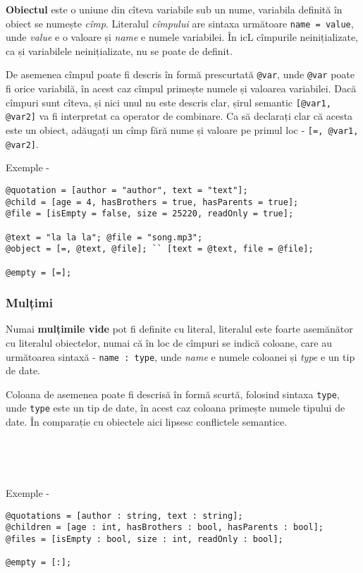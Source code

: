 {\bf Obiectul} este o uniune din cîteva variabile sub un nume, variabila definită în obiect se numește {\it cîmp}. Literalul {\it cîmpului} are sintaxa următoare \texttt{name = value}, unde  {\it value} e o valoare și {\it name} e numele variabilei. În icL cîmpurile neinițializate, ca și variabilele neinițializate, nu se poate de definit.

De asemenea cîmpul poate fi descris în formă prescurtată \texttt{@var}, unde \texttt{@var} poate fi orice variabilă, în acest caz cîmpul primește numele și valoarea variabilei. Dacă cîmpuri sunt cîteva, și nici unul nu este descris clar, șirul semantic \texttt{[@var1, @var2]} va fi interpretat ca operator de combinare. Ca să declarați clar că acesta este un obiect, adăugați un cîmp fără nume și valoare pe primul loc - \texttt{[=, @var1, @var2]}.

\noindent Exemple -
\begin{verbatim}
@quotation = [author = "author", text = "text"];
@child = [age = 4, hasBrothers = true, hasParents = true];
@file = [isEmpty = false, size = 25220, readOnly = true];

@text = "la la la"; @file = "song.mp3";
@object = [=, @text, @file]; `` [text = @text, file = @file];

@empty = [=];
\end{verbatim}

\subsubsection{Mulțimi}

Numai {\bf mulțimile vide} pot fi definite cu literal, literalul este foarte asemănător cu literalul obiectelor, numai că în loc de cîmpuri se indică coloane, care au următoarea sintaxă - \texttt{name : type}, unde  {\it name} e numele coloanei și {\it type} e un tip de date.

Coloana de asemenea poate fi descrisă în formă scurtă, folosind sintaxa \texttt{type}, unde \texttt{type} este un tip de date, în acest caz coloana primește numele tipului de date. În comparație cu obiectele aici lipsesc conflictele semantice.

\

\

\noindent Exemple -
\begin{verbatim}
@quotations = [author : string, text : string];
@children = [age : int, hasBrothers : bool, hasParents : bool];
@files = [isEmpty : bool, size : int, readOnly : bool];

@empty = [:];
\end{verbatim}

